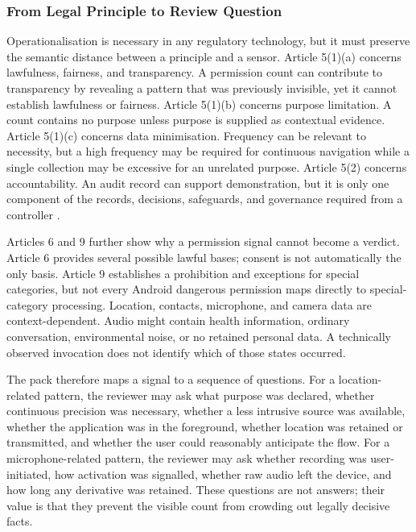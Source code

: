 \subsubsection{From Legal Principle to Review Question}

Operationalisation is necessary in any regulatory technology, but it must preserve the semantic distance between a principle and a sensor. Article 5(1)(a) concerns lawfulness, fairness, and transparency. A permission count can contribute to transparency by revealing a pattern that was previously invisible, yet it cannot establish lawfulness or fairness. Article 5(1)(b) concerns purpose limitation. A count contains no purpose unless purpose is supplied as contextual evidence. Article 5(1)(c) concerns data minimisation. Frequency can be relevant to necessity, but a high frequency may be required for continuous navigation while a single collection may be excessive for an unrelated purpose. Article 5(2) concerns accountability. An audit record can support demonstration, but it is only one component of the records, decisions, safeguards, and governance required from a controller \cite{eurlex2016}.

Articles 6 and 9 further show why a permission signal cannot become a verdict. Article 6 provides several possible lawful bases; consent is not automatically the only basis. Article 9 establishes a prohibition and exceptions for special categories, but not every Android dangerous permission maps directly to special-category processing. Location, contacts, microphone, and camera data are context-dependent. Audio might contain health information, ordinary conversation, environmental noise, or no retained personal data. A technically observed invocation does not identify which of those states occurred.

The pack therefore maps a signal to a sequence of questions. For a location-related pattern, the reviewer may ask what purpose was declared, whether continuous precision was necessary, whether a less intrusive source was available, whether the application was in the foreground, whether location was retained or transmitted, and whether the user could reasonably anticipate the flow. For a microphone-related pattern, the reviewer may ask whether recording was user-initiated, how activation was signalled, whether raw audio left the device, and how long any derivative was retained. These questions are not answers; their value is that they prevent the visible count from crowding out legally decisive facts.

